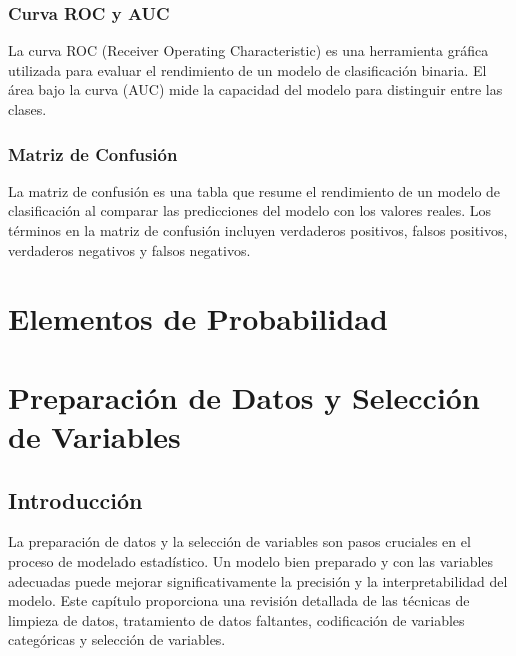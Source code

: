 \documentclass[a4paper]{report} %
\begin{document}
\subsection{Curva ROC y AUC}
La curva ROC (Receiver Operating Characteristic) es una herramienta gr\'afica utilizada para evaluar el rendimiento de un modelo de clasificaci\'on binaria. El \'area bajo la curva (AUC) mide la capacidad del modelo para distinguir entre las clases.
\subsection{Matriz de Confusi\'on}
La matriz de confusi\'on es una tabla que resume el rendimiento de un modelo de clasificaci\'on al comparar las predicciones del modelo con los valores reales. Los t\'erminos en la matriz de confusi\'on incluyen verdaderos positivos, falsos positivos, verdaderos negativos y falsos negativos.




\chapter{Elementos de Probabilidad}

\chapter{Preparaci\'on de Datos y Selecci\'on de Variables}


\section{Introducci\'on}

La preparaci\'on de datos y la selecci\'on de variables son pasos cruciales en el proceso de modelado estad\'istico. Un modelo bien preparado y con las variables adecuadas puede mejorar significativamente la precisi\'on y la interpretabilidad del modelo. Este cap\'itulo proporciona una revisi\'on detallada de las t\'ecnicas de limpieza de datos, tratamiento de datos faltantes, codificaci\'on de variables categ\'oricas y selecci\'on de variables.
\end{document}

